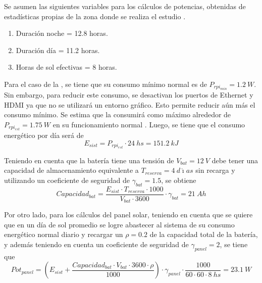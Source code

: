 
Se asumen las siguientes variables para los cálculos de potencias, obtenidas de estadísticas propias de la zona donde se realiza el estudio \cite{ref:weather_bariloche}.
\begin{enumerate}
	\item Duración noche = 12.8 horas.
	\item Duración día = 11.2 horas.
	\item Horas de sol efectivas = 8 horas.
\end{enumerate}

Para el caso de la \rpi, se tiene que su consumo mínimo normal es de $P_{rpi_{min}} = 1.2 \ W$. Sin embargo, para reducir este consumo, se desactivan los puertos de Ethernet y HDMI ya que no se utilizará un entorno gráfico. Esto permite reducir aún más el consumo mínimo. Se estima que la \rspi consumirá como máximo alrededor de $P_{rpi_{est}} = 1.75 \ W$ en su funcionamiento normal \cite{ref:pot_rpi}. Luego, se tiene que el consumo energético por día será de
\begin{equation}
	E_{sist} = P_{rpi_{est}}\cdot 24 \ hs = 151.2 \ kJ
\end{equation}

Teniendo en cuenta que la batería tiene una tensión de $V_{bat} = 12 \ V$ debe tener una capacidad de almacenamiento equivalente a $T_{reserva} = 4 \ d\acute{\imath}as$ sin recarga \cite{ref:weather_bariloche} y utilizando un coeficiente de seguridad de $\gamma_{bat} = 1.5$, se obtiene
\begin{equation}
	Capacidad_{bat} = \frac{E_{sist}\cdot T_{reserva}\cdot 1000}{V_{bat}\cdot 3600}\cdot \gamma_{bat} = 21 \ Ah
\end{equation}

Por otro lado, para los cálculos del panel solar, teniendo en cuenta que se quiere que en un día de sol promedio se logre abastecer al sistema de su consumo energético normal diario y recargar un $\rho = 0.2$ de la capacidad total de la batería, y además teniendo en cuenta un coeficiente de seguridad de $\gamma_{panel} = 2$, se tiene que
\begin{equation}
	Pot_{panel} = \left( E_{sist} + \frac{Capacidad_{bat}\cdot V_{bat}\cdot 3600\cdot \rho}{1000}\right)\cdot \gamma_{panel} \cdot  \frac{1000}{60\cdot 60\cdot 8 \ hs} = 23.1 \ W
\end{equation}


